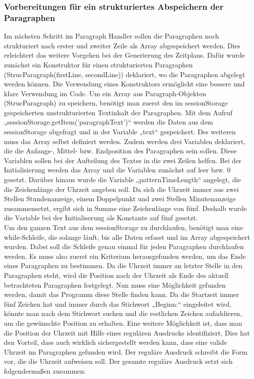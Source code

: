 {\subsubsection{Vorbereitungen für ein strukturiertes Abspeichern der Paragraphen}
Im nächsten Schritt im Paragraph Handler sollen die Paragraphen noch strukturiert nach erster und zweiter Zeile als Array abgespeichert werden. Dies erleichtert das weitere Vorgehen bei der Generierung des Zeitplans. Dafür wurde zunächst ein Konstruktor für einen strukturierten Paragraphen (StrucParagraph(firstLine, secondLine)) deklariert, wo die Paragraphen abgelegt werden können. Die Verwendung eines Konstruktors ermöglicht eine bessere und klare Verwendung im Code. Um ein Array aus Paragraph-Objekten (StrucParagraph) zu speichern, benötigt man zuerst den im sessionStorage gespeicherten unstrukturierten Textinhalt der Paragraphen. Mit dem Aufruf „sessionStorage.getItem('paragraphText')“ werden die Daten aus dem sessionStorage abgefragt und in der Variable „text“ gespeichert. Des weiteren muss das Array selbst definiert werden. Zudem werden drei Variablen deklariert, die die Anfangs-, Mittel- bzw. Endposition des Paragraphen sein sollen. Diese Variablen sollen bei der Aufteilung des Textes in die zwei Zeilen helfen. Bei der Initialisierung werden das Array und die Variablen zunächst auf leer bzw. 0 gesetzt. Darüber hinaus wurde die Variable „patternTimeLength“ angelegt, die die Zeichenlänge der Uhrzeit angeben soll. Da sich die Uhrzeit immer aus zwei Stellen Stundenanzeige, einem Doppelpunkt und zwei Stellen Minutenanzeige zusammensetzt, ergibt sich in Summe eine Zeichenlänge von fünf. Deshalb wurde die Variable bei der Initialiserung als Konstante auf fünf gesetzt.\\
Um den ganzen Text aus dem sessionStorage zu durchlaufen, benötigt man eine while-Schleife, die solange läuft, bis alle Daten erfasst und im Array abgespeichert wurden. Dabei soll die Schleife genau einmal für jeden Paragraphen durchlaufen werden. Es muss also zuerst ein Kriterium herausgefunden werden, um das Ende eines Paragraphen zu bestimmen. Da die Uhrzeit immer an letzter Stelle in den Paragraphen steht, wird die Position nach der Uhrzeit als Ende des aktuell betrachteten Paragraphen festgelegt. Nun muss eine Möglichkeit gefunden werden, damit das Programm diese Stelle finden kann. Da die Startzeit immer fünf Zeichen hat und immer durch das Stichwort „Beginn:“ eingeleitet wird, könnte man nach dem Stichwort suchen und die restlichen Zeichen aufaddieren, um die gewünschte Position zu erhalten. Eine weitere Möglichkeit ist, dass man die Position der Uhrzeit mit Hilfe eines regulären Ausdrucks identifiziert. Dies hat den Vorteil, dass auch wirklich sichergestellt werden kann, dass eine valide Uhrzeit im Paragraphen gefunden wird. Der reguläre Ausdruck schreibt die Form vor, die die Uhrzeit aufweisen soll. Der gesamte reguläre Ausdruck setzt sich folgendermaßen zusammen:
}
